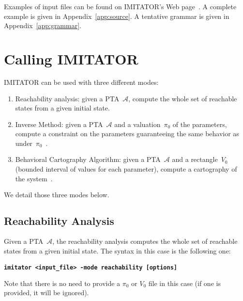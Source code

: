 \documentclass[a4paper,11pt]{report}
\newcommand{\A}{\mathcal{A}}
\newcommand{\imitator}{\textsf{IMITATOR}}
\newcommand{\imitatorExec}{\code{imitator}}
\newcommand{\code}[1]{\textbf{\texttt{#1}}}
\begin{document}
Examples of input files can be found on \imitator{}'s Web page~\cite{imitator}.
A complete example is given in Appendix~\ref{app:source}.
A tentative grammar is given in Appendix~\ref{app:grammar}.



\section{Calling \imitator}

\imitator{} can be used with three different modes:

\begin{enumerate}
	\item Reachability analysis: given a PTA~$\A$, compute the whole set of reachable states from a given initial state.
	\item Inverse Method: given a PTA~$\A$ and a valuation~$\pi_0$ of the parameters, compute a constraint on the parameters guaranteeing the same behavior as under~$\pi_0$~\cite{AS13}.
	\item Behavioral Cartography Algorithm: given a PTA~$\A$ and a rectangle~$V_0$ (bounded interval of values for each parameter), compute a cartography of the system~\cite{AF10}.
\end{enumerate}

We detail those three modes below.



\subsection{Reachability Analysis} \label{ss:mode_reachability}

Given a PTA~$\A$, the reachability analysis computes the whole set of reachable states from a given initial state.
The syntax in this case is the following one:

\code{\imitatorExec{} <input\_file> -mode reachability [options]}

Note that there is no need to provide a $\pi_0$ or $V_0$ file in this case (if one is provided, it will be ignored).



\end{document}
